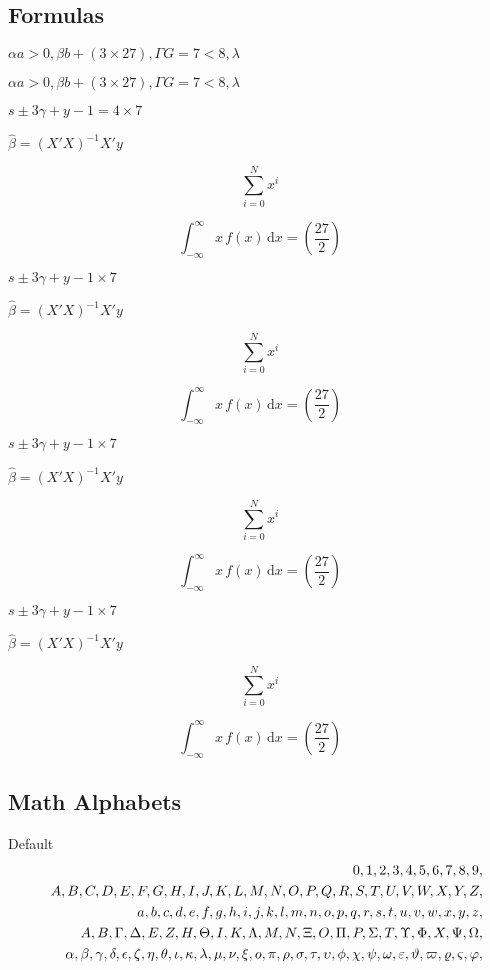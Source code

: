 \subsection{Formulas \showfamily}

\noindent
\checkgreekletters

\noindent
{\boldmath\checkgreekletters}

\noindent
{\sffamily\selectfont \checkgreekletters}

\noindent
{\sffamily\bfseries\selectfont \checkgreekletters}

\noindent
{\sffamily $\alpha a > 0, \beta b + (3 \times 27), \Gamma G = 7 < 8, \lambda$}

\noindent
$\alpha a > 0, \beta b + (3 \times 27), \Gamma G = 7 < 8, \lambda$

$s \pm 3 \gamma + y - 1 = 4 \times 7$

$\hat{\beta} = (X'X)^{-1}X'y$

$$\sum_{i=0}^{N} x^i$$

$$\int_{-\infty}^{\infty} x\,f(x)\,\mathup{d}x = \left( \frac{27}{2} \right)$$

\noindent
{\bfseries
$s \pm 3 \gamma + y - 1 \times 7$

$\hat{\beta} = (X'X)^{-1}X'y$

$$\sum_{i=0}^{N} x^i$$

$$\int_{-\infty}^{\infty} x\,f(x)\,\mathup{d}x = \left( \frac{27}{2} \right)$$
}

\noindent
{\sffamily
$s \pm 3 \gamma + y - 1 \times 7$

$\hat{\beta} = (X'X)^{-1}X'y$

$$\sum_{i=0}^{N} x^i$$

$$\int_{-\infty}^{\infty} x\,f(x)\,\mathup{d}x = \left( \frac{27}{2} \right)$$
}

\noindent
{\sffamily\bfseries
$s \pm 3 \gamma + y - 1 \times 7$

$\hat{\beta} = (X'X)^{-1}X'y$

$$\sum_{i=0}^{N} x^i$$

$$\int_{-\infty}^{\infty} x\,f(x)\,\mathup{d}x = \left( \frac{27}{2} \right)$$
}


\subsection{Math Alphabets \showfamily}


Default
\def\test#1{#1,}
\begin{eqnarray*}
  && {\testnums}\\
  && {\testupper}\\
  && {\testlower}\\ 
  && {\testupgreek}\\
  && {\testlowgreek}
\end{eqnarray*}%

